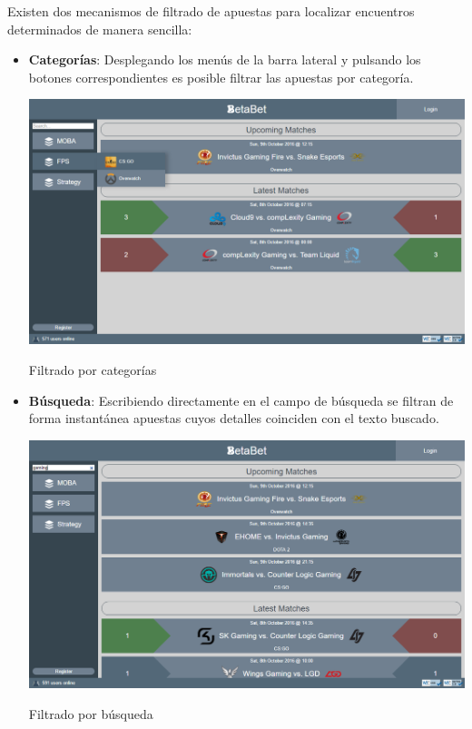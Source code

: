 \documentclass{article}
\begin{document}
\newpage
Existen dos mecanismos de filtrado de apuestas para localizar encuentros determinados de manera sencilla:
\begin{itemize}
    \item\textbf{Categorías}: Desplegando los menús de la barra lateral y pulsando los botones correspondientes es posible filtrar las apuestas por categoría.
    \smallskip\newline
    \begin{minipage}{\linewidth}
        \centering
        \captionsetup{type=figure}
        \includegraphics[width=.9\linewidth]{fig3}
        \caption{Filtrado por categorías}
        \label{fig:fig3}
    \end{minipage}
    \item\textbf{Búsqueda}: Escribiendo directamente en el campo de búsqueda se filtran de forma instantánea apuestas cuyos detalles coinciden con el texto buscado.
    \smallskip\newline
    \begin{minipage}{\linewidth}
        \centering
        \captionsetup{type=figure}
        \includegraphics[width=.9\linewidth]{fig4}
        \caption{Filtrado por búsqueda}
        \label{fig:fig4}
    \end{minipage}
\end{itemize}
\newpage
\end{document}
